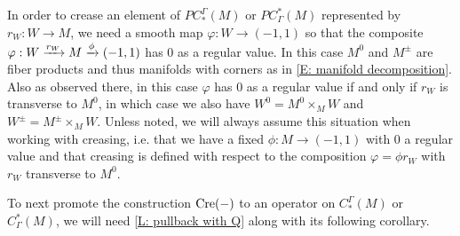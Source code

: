 \begin{convention}\label{C: regular value setup}
In order to crease an element of $PC_*^\Gamma(M)$ or $PC^*_\Gamma(M)$ represented by $r_W:W\to M$, we need a smooth map $\varphi:W\to (-1,1)$ so that the composite  $\varphi: W\xrightarrow{r_W}M\xrightarrow{\phi} (-1,1)$ has $0$ as a regular value. In this case $M^0$ and $M^\pm$ are fiber products and thus manifolds with corners as in \cref{E: manifold decomposition}. Also as observed there, in this case $\varphi$ has $0$ as a regular value if and only if $r_W$ is transverse to $M^0$, in which case we also have $W^0=M^0\times_M W$ and $W^\pm=M^\pm\times_M W$. Unless noted, we will always assume this situation when working with creasing, i.e. that we have a fixed $\phi:M\to (-1,1)$ with $0$ a regular value and that creasing is defined with respect to the composition $\varphi=\phi r_W$ with $r_W$  transverse to $M^0$.
\end{convention}


To next promote the construction $\mathrm{Cre}(-)$ to an operator on $C_*^{\Gamma}(M)$ or $C^*_\Gamma(M)$, we will need   \cref{L: pullback with Q} along with its following corollary.


